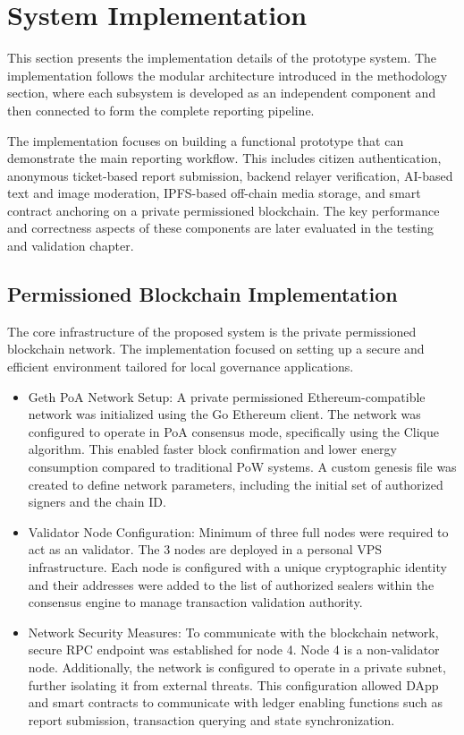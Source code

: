 \chapter{System Implementation}


This section presents the implementation details of the prototype system. The implementation follows the modular architecture introduced in the methodology section, where each subsystem is developed as an independent component and then connected to form the complete reporting pipeline.

The implementation focuses on building a functional prototype that can demonstrate the main reporting workflow. This includes citizen authentication, anonymous ticket-based report submission, backend relayer verification, AI-based text and image moderation, IPFS-based off-chain media storage, and smart contract anchoring on a private permissioned blockchain. The key performance and correctness aspects of these components are later evaluated in the testing and validation chapter.

\section{Permissioned Blockchain Implementation}

\begin{sloppypar}
The core infrastructure of the proposed system is the private permissioned blockchain network. The implementation focused on setting up a secure and efficient environment tailored for local governance applications.
\end{sloppypar}

\begin{itemize}
    \item {Geth \ac{PoA} Network Setup:} A private permissioned Ethereum-compatible network was initialized using the Go Ethereum client. The network was configured to operate in \ac{PoA} consensus mode, specifically using the Clique algorithm. This enabled faster block confirmation and lower energy consumption compared to traditional \ac{PoW} systems. A custom genesis file was created to define network parameters, including the initial set of authorized signers and the chain ID.
    
    \item {Validator Node Configuration:} Minimum of three full nodes were required to act as an validator. The 3 nodes are deployed in a personal \ac{VPS} infrastructure. Each node is configured with a unique cryptographic identity and their addresses were added to the list of authorized sealers within the consensus engine to manage transaction validation authority.

    \item {Network Security Measures:} To communicate with the blockchain network, secure \ac{RPC} endpoint was established for node 4. Node 4 is a non-validator node. Additionally, the network is configured to operate in a private subnet, further isolating it from external threats. This configuration allowed DApp and smart contracts to communicate with ledger enabling functions such as report submission, transaction querying and state synchronization.
\end{itemize}

